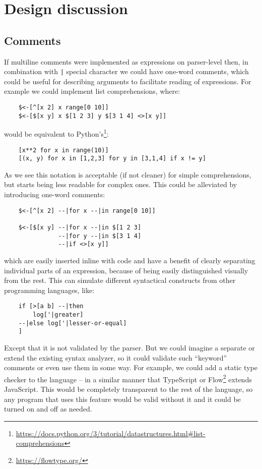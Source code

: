 \chapter{Design discussion}\label{chap:design}

\section{Comments}\label{sec:comments}
If multiline comments were implemented as expressions on parser-level then, in combination with \texttt{|} special character we could have one-word comments, which could be useful for describing arguments to facilitate reading of expressions. For example we could implement list comprehensions, where:
\begin{lstlisting}
    $<-[^[x 2] x range[0 10]]
    $<-[$[x y] x $[1 2 3] y $[3 1 4] <>[x y]]
\end{lstlisting}
would be equivalent to Python's\footnote{\url{https://docs.python.org/3/tutorial/datastructures.html\#list-comprehensions}}:
\begin{lstlisting}
    [x**2 for x in range(10)]
    [(x, y) for x in [1,2,3] for y in [3,1,4] if x != y]
\end{lstlisting}
As we see this notation is acceptable (if not cleaner) for simple comprehensions, but starts being less readable for complex ones. This could be alleviated by introducing one-word comments:
\begin{lstlisting}
    $<-[^[x 2] --|for x --|in range[0 10]]
    
    $<-[$[x y] --|for x --|in $[1 2 3]
               --|for y --|in $[3 1 4]
               --|if <>[x y]]
\end{lstlisting}
which are easily inserted inline with code and have a benefit of clearly separating individual parts of an expression, because of being easily distinguished visually from the rest. This can simulate different syntactical constructs from other programming languages, like:
\begin{lstlisting}
    if [>[a b] --|then
        log['|greater]
    --|else log['|lesser-or-equal]
    ]
\end{lstlisting}
Except that it is not validated by the parser. But we could imagine a separate or extend the existing syntax analyzer, so it could validate such ``keyword'' comments or even use them in some way. For example, we could add a static type checker to the language -- in a similar manner that TypeScript or Flow\footnote{\url{https://flowtype.org/}} extends JavaScript. This would be completely transparent to the rest of the language, so any program that uses this feature would be valid without it and it could be turned on and off as needed.

